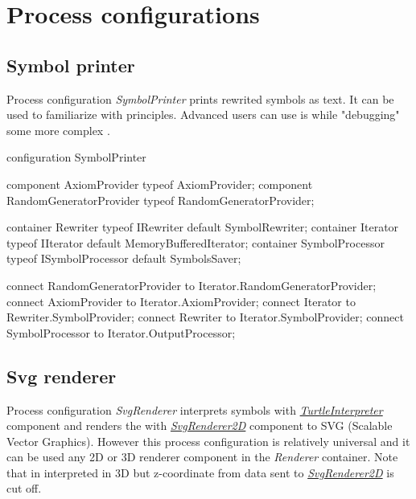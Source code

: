 \section{Process configurations}
\label{sec:stdLibProcessConfigurations}

\subsection{Symbol printer}

Process configuration \emph{SymbolPrinter} prints rewrited symbols as text.
It can be used to familiarize with \lsystem principles.
Advanced users can use is while "debugging" some more complex \lsystem.

\begin{LsystemBreak}
configuration SymbolPrinter {
	component AxiomProvider typeof AxiomProvider;
	component RandomGeneratorProvider
		typeof RandomGeneratorProvider;

	container Rewriter typeof IRewriter default SymbolRewriter;
	container Iterator typeof IIterator
		default MemoryBufferedIterator;
	container SymbolProcessor typeof ISymbolProcessor
		default SymbolsSaver;

	connect RandomGeneratorProvider
		to Iterator.RandomGeneratorProvider;
	connect AxiomProvider to Iterator.AxiomProvider;
	connect Iterator to Rewriter.SymbolProvider;
	connect Rewriter to Iterator.SymbolProvider;
	connect SymbolProcessor to Iterator.OutputProcessor;
}
\end{LsystemBreak}


\subsection{Svg renderer}
\label{configurationSvgRenderer}

Process configuration \emph{SvgRenderer} interprets symbols with \hyperref[Malsys.Processing.Components.Interpreters.TurtleInterpreter]{\emph{TurtleInterpreter}} component
	and renders the with \hyperref[Malsys.Processing.Components.Renderers.SvgRenderer2D]{\emph{SvgRenderer2D}} component to SVG (Scalable Vector Graphics).
However this process configuration is relatively universal and it can be used any 2D or 3D renderer component in the \emph{Renderer} container.
Note that \lsystem in interpreted in 3D but z-coordinate from data sent to \hyperref[Malsys.Processing.Components.Renderers.SvgRenderer2D]{\emph{SvgRenderer2D}} is cut off.

